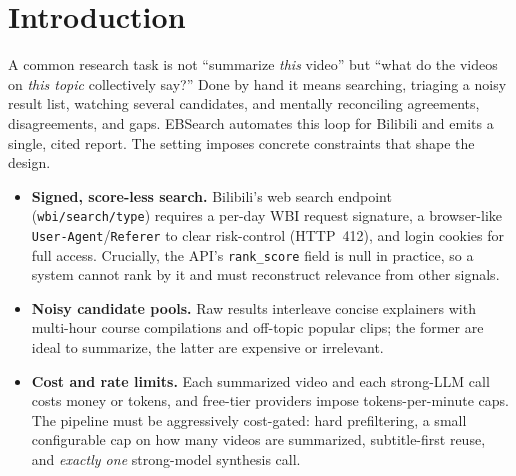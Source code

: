 \documentclass[conference]{IEEEtran}
\begin{document}
\section{Introduction}

A common research task is not ``summarize \emph{this} video'' but ``what do the
videos on \emph{this topic} collectively say?'' Done by hand it means searching,
triaging a noisy result list, watching several candidates, and mentally
reconciling agreements, disagreements, and gaps. EBSearch automates this loop for
Bilibili and emits a single, cited report. The setting imposes concrete
constraints that shape the design.

\begin{itemize}
  \item \textbf{Signed, score-less search.} Bilibili's web search endpoint
  (\texttt{wbi/search/type}) requires a per-day WBI request signature, a
  browser-like \texttt{User-Agent}/\texttt{Referer} to clear risk-control
  (HTTP~412), and login cookies for full access. Crucially, the API's
  \texttt{rank\_score} field is null in practice, so a system cannot rank by it
  and must reconstruct relevance from other signals.
  \item \textbf{Noisy candidate pools.} Raw results interleave concise
  explainers with multi-hour course compilations and off-topic popular clips;
  the former are ideal to summarize, the latter are expensive or irrelevant.
  \item \textbf{Cost and rate limits.} Each summarized video and each strong-LLM
  call costs money or tokens, and free-tier providers impose tokens-per-minute
  caps. The pipeline must be aggressively cost-gated: hard prefiltering, a small
  configurable cap on how many videos are summarized, subtitle-first reuse, and
  \emph{exactly one} strong-model synthesis call.
\end{itemize}
\end{document}
